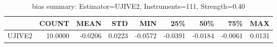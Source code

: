 \begin{table}[ht]
\centering
\caption{bias summary: Estimator=UJIVE2, Instruments=111, Strength=0.40}
\begin{tabular}{lrrrrrrrr}
\toprule
 & COUNT & MEAN & STD & MIN & 25\% & 50\% & 75\% & MAX \\
\midrule
UJIVE2 & 10.0000 & -0.0206 & 0.0223 & -0.0572 & -0.0391 & -0.0184 & -0.0061 & 0.0131 \\
\bottomrule
\end{tabular}
\end{table}
